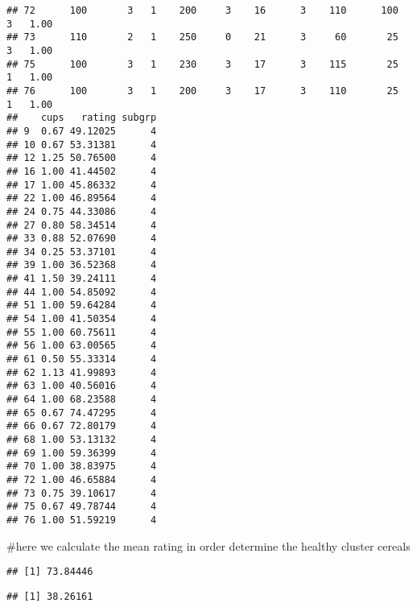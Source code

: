 \documentclass[
]{article}
\newenvironment{Shaded}{\begin{snugshade}}{\end{snugshade}}
\newcommand{\DecValTok}[1]{\textcolor[rgb]{0.00,0.00,0.81}{#1}}
\newcommand{\FunctionTok}[1]{\textcolor[rgb]{0.00,0.00,0.00}{#1}}
\newcommand{\NormalTok}[1]{#1}
\newcommand{\SpecialCharTok}[1]{\textcolor[rgb]{0.00,0.00,0.00}{#1}}
\newcommand{\StringTok}[1]{\textcolor[rgb]{0.31,0.60,0.02}{#1}}
\begin{document}
\begin{verbatim}
## 72      100       3   1    200     3    16      3    110      100     3   1.00
## 73      110       2   1    250     0    21      3     60       25     3   1.00
## 75      100       3   1    230     3    17      3    115       25     1   1.00
## 76      100       3   1    200     3    17      3    110       25     1   1.00
##    cups   rating subgrp
## 9  0.67 49.12025      4
## 10 0.67 53.31381      4
## 12 1.25 50.76500      4
## 16 1.00 41.44502      4
## 17 1.00 45.86332      4
## 22 1.00 46.89564      4
## 24 0.75 44.33086      4
## 27 0.80 58.34514      4
## 33 0.88 52.07690      4
## 34 0.25 53.37101      4
## 39 1.00 36.52368      4
## 41 1.50 39.24111      4
## 44 1.00 54.85092      4
## 51 1.00 59.64284      4
## 54 1.00 41.50354      4
## 55 1.00 60.75611      4
## 56 1.00 63.00565      4
## 61 0.50 55.33314      4
## 62 1.13 41.99893      4
## 63 1.00 40.56016      4
## 64 1.00 68.23588      4
## 65 0.67 74.47295      4
## 66 0.67 72.80179      4
## 68 1.00 53.13132      4
## 69 1.00 59.36399      4
## 70 1.00 38.83975      4
## 72 1.00 46.65884      4
## 73 0.75 39.10617      4
## 75 0.67 49.78744      4
## 76 1.00 51.59219      4
\end{verbatim}

\#here we calculate the mean rating in order determine the healthy
cluster cereals

\begin{Shaded}
\end{Shaded}

\begin{verbatim}
## [1] 73.84446
\end{verbatim}

\begin{Shaded}
\end{Shaded}

\begin{verbatim}
## [1] 38.26161
\end{verbatim}

\begin{Shaded}
\end{Shaded}
\end{document}
